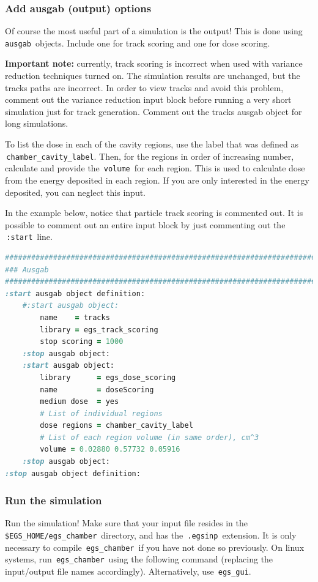 \documentclass[12pt,twoside]{article}
\begin{document}
\subsubsection{Add ausgab (output) options}
Of course the most useful part of a simulation is the output! This is done
using \,\Verb|ausgab|\, objects. Include one for track scoring and one for
dose scoring.

\textbf{Important note:} currently, track scoring is incorrect when used with variance
reduction techniques turned on. The simulation results are unchanged, but the
tracks paths are incorrect. In order to view tracks and avoid this problem,
comment out the variance reduction input block before running a very short
simulation just for track generation. Comment out the tracks ausgab object
for long simulations.

To list the dose in each of the cavity regions, use the label that was defined
as \\
\,\Verb|chamber_cavity_label|. Then, for the regions in order of increasing
number, calculate and provide the
\,\Verb|volume|\, for each region. This is used to calculate dose from the
energy deposited in each region. If you are only interested in the energy
deposited, you can neglect this input.

In the example below, notice that particle track scoring is commented out.
It is possible to comment out an entire input block by just commenting out the
\,\Verb|:start|\, line.

{\small
\begin{lstlisting}[language=ruby,backgroundcolor=\color{white}]
##############################################################################
### Ausgab
##############################################################################
:start ausgab object definition:
    #:start ausgab object:
        name    = tracks
        library = egs_track_scoring
        stop scoring = 1000
    :stop ausgab object:
    :start ausgab object:
        library      = egs_dose_scoring
        name         = doseScoring
        medium dose  = yes
        # List of individual regions
        dose regions = chamber_cavity_label
        # List of each region volume (in same order), cm^3
        volume = 0.02880 0.57732 0.05916
    :stop ausgab object:
:stop ausgab object definition:
\end{lstlisting}
}


\subsubsection{Run the simulation}
Run the simulation! Make sure that your input file resides in the \,\Verb|$EGS_HOME/egs_chamber|\, directory, and has the \,\Verb|.egsinp|\, extension.
It is only necessary to compile \,\Verb|egs_chamber|\, if you have not done
so previously. On linux systems, run \,\Verb|egs_chamber|\, using the following
command (replacing the input/output file names accordingly). Alternatively,
use \,\Verb|egs_gui|.
\end{document}
